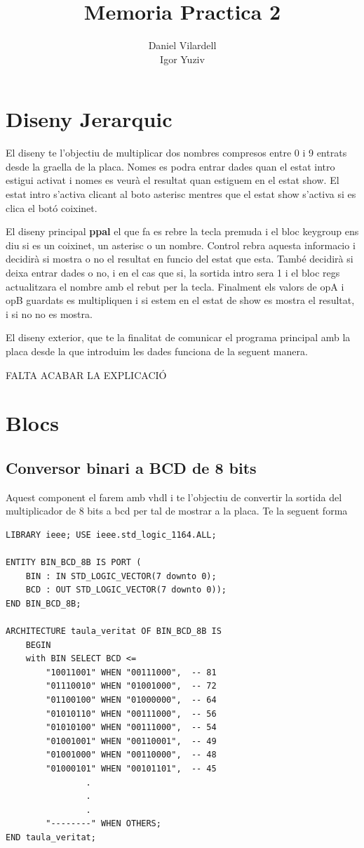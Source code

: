 \documentclass[12pt, a4papre]{article}
\author{Daniel Vilardell\\
	   Igor Yuziv}
\title{Memoria Practica 2}
\date{}
\begin{document}
	\maketitle
	\tableofcontents
     
     \newpage

	\section{Diseny Jerarquic}
	
	El diseny te l'objectiu de multiplicar dos nombres compresos entre 0 i 9 entrats desde la graella de la placa. Nomes es podra entrar dades quan el estat intro estigui activat i nomes es veurà el resultat quan estiguem en el estat show. El estat intro s'activa clicant al boto asterisc mentres que el estat show s'activa si es clica el botó coixinet. 
	
	El diseny principal \textbf{ppal} el que fa es rebre la tecla premuda i el bloc keygroup ens diu si es un coixinet, un asterisc o un nombre. Control rebra aquesta informacio i decidirà si mostra o no el resultat en funcio del estat que esta. També decidirà si deixa entrar dades o no, i en el cas que si, la sortida intro sera 1 i el bloc regs actualitzara el nombre amb el rebut per la tecla. Finalment els valors de opA i opB guardats es multipliquen i si estem en el estat de show es mostra el resultat, i si no no es mostra.
	
	El diseny exterior, que te la finalitat de comunicar el programa principal amb la placa desde la que introduim les dades funciona de la seguent manera.
	
	FALTA ACABAR LA EXPLICACIÓ
	
	\section{Blocs}
	
	\subsection{Conversor binari a BCD de 8 bits}
	
	Aquest component el farem amb vhdl i te l'objectiu de convertir la sortida del multiplicador de 8 bits a bcd per tal de mostrar a la placa. Te la seguent forma
	\begin{lstlisting}[style=vhdl, frame=single, basicstyle=\tiny]
LIBRARY ieee; USE ieee.std_logic_1164.ALL;  

ENTITY BIN_BCD_8B IS PORT (   
	BIN : IN STD_LOGIC_VECTOR(7 downto 0);   
	BCD : OUT STD_LOGIC_VECTOR(7 downto 0)); 
END BIN_BCD_8B;  

ARCHITECTURE taula_veritat OF BIN_BCD_8B IS   
	BEGIN 
	with BIN SELECT BCD <=     	
		"10011001" WHEN "00111000",  -- 81     
		"01110010" WHEN "01001000",  -- 72      
		"01100100" WHEN "01000000",  -- 64     
		"01010110" WHEN "00111000",  -- 56     
		"01010100" WHEN "00111000",  -- 54        
		"01001001" WHEN "00110001",  -- 49     
		"01001000" WHEN "00110000",  -- 48     
		"01000101" WHEN "00101101",  -- 45     
				.
				.
				. 
		"--------" WHEN OTHERS;   
END taula_veritat;


\end{lstlisting}
\end{document}
